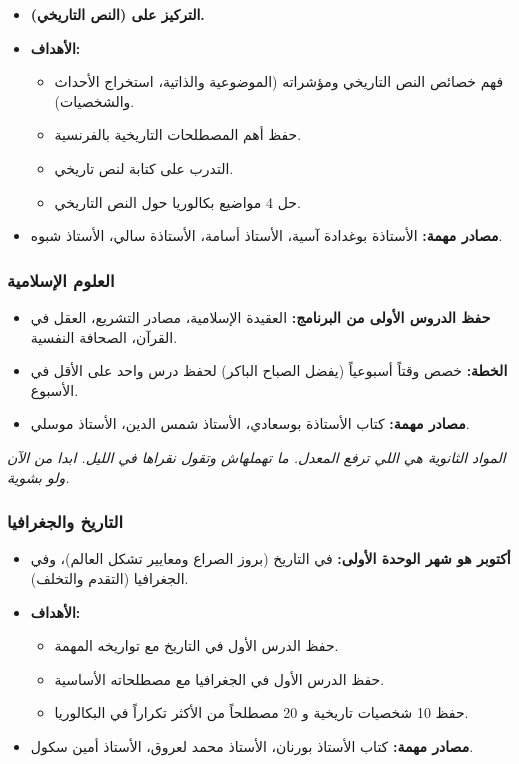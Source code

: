 \documentclass[12pt,a4paper]{book}
\newcommand{\quoteAr}[1]{%
	\begin{myquote}
		\itshape #1
	\end{myquote}
}
\begin{document}
	\begin{itemize}
		\item \textbf{التركيز على  (النص التاريخي).}
		\item \textbf{الأهداف:}
		\begin{itemize}
			\item فهم خصائص النص التاريخي ومؤشراته (الموضوعية والذاتية، استخراج الأحداث والشخصيات).
			\item حفظ أهم المصطلحات التاريخية بالفرنسية.
			\item التدرب على كتابة  لنص تاريخي.
			\item حل 4 مواضيع بكالوريا حول النص التاريخي.
		\end{itemize}
		\item \textbf{مصادر مهمة:} الأستاذة بوغدادة آسية، الأستاذ أسامة، الأستاذة سالي، الأستاذ شبوه.
	\end{itemize}
	
	\subsubsection{العلوم الإسلامية}
	
	\begin{itemize}
		\item \textbf{حفظ الدروس الأولى من البرنامج:} العقيدة الإسلامية، مصادر التشريع، العقل في القرآن، الصحافة النفسية.
		\item \textbf{الخطة:} خصص وقتاً أسبوعياً (يفضل الصباح الباكر) لحفظ درس واحد على الأقل في الأسبوع.
		\item \textbf{مصادر مهمة:} كتاب الأستاذة بوسعادي، الأستاذ شمس الدين، الأستاذ موسلي.
	\end{itemize}
	
	\quoteAr{المواد الثانوية هي اللي ترفع المعدل. ما تهملهاش وتقول نقراها في الليل. ابدا من الآن ولو بشوية.}
	
	\subsubsection{التاريخ والجغرافيا}
	
	\begin{itemize}
		\item \textbf{أكتوبر هو شهر الوحدة الأولى:} في التاريخ (بروز الصراع ومعايير تشكل العالم)، وفي الجغرافيا (التقدم والتخلف).
		\item \textbf{الأهداف:}
		\begin{itemize}
			\item حفظ الدرس الأول في التاريخ مع تواريخه المهمة.
			\item حفظ الدرس الأول في الجغرافيا مع مصطلحاته الأساسية.
			\item حفظ 10 شخصيات تاريخية و 20 مصطلحاً من الأكثر تكراراً في البكالوريا.
		\end{itemize}
		\item \textbf{مصادر مهمة:} كتاب الأستاذ بورنان، الأستاذ محمد لعروق، الأستاذ أمين سكول.
	\end{itemize}
	
\end{document}

